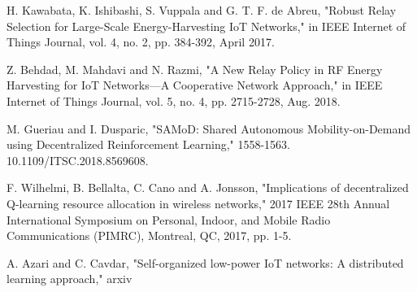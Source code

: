 \documentclass[journal]{IEEEtran}
\begin{document}
\begin{thebibliography}{1}
H. Kawabata, K. Ishibashi, S. Vuppala and G. T. F. de Abreu, "Robust Relay Selection for Large-Scale Energy-Harvesting IoT Networks," in IEEE Internet of Things Journal, vol. 4, no. 2, pp. 384-392, April 2017.

Z. Behdad, M. Mahdavi and N. Razmi, "A New Relay Policy in RF Energy Harvesting for IoT Networks—A Cooperative Network Approach," in IEEE Internet of Things Journal, vol. 5, no. 4, pp. 2715-2728, Aug. 2018.

M. Gueriau and I. Dusparic, "SAMoD: Shared Autonomous Mobility-on-Demand using Decentralized Reinforcement Learning,"  1558-1563. 10.1109/ITSC.2018.8569608.

F. Wilhelmi, B. Bellalta, C. Cano and A. Jonsson, "Implications of decentralized Q-learning resource allocation in wireless networks," 2017 IEEE 28th Annual International Symposium on Personal, Indoor, and Mobile Radio Communications (PIMRC), Montreal, QC, 2017, pp. 1-5.

A. Azari and C. Cavdar, "Self-organized low-power IoT networks: A distributed learning approach," arxiv


\end{thebibliography}


\end{document}
